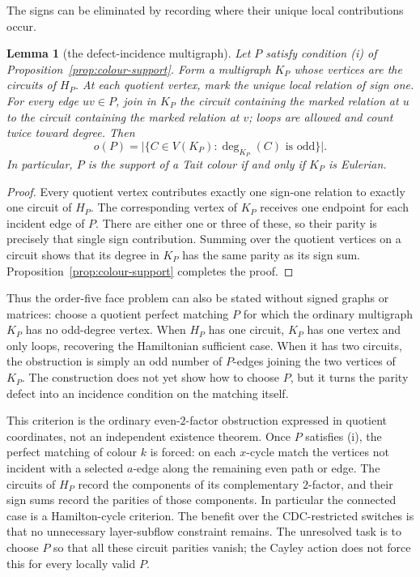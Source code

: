 \documentclass[11pt,a4paper]{article}
\newtheorem{lemma}[theorem]{Lemma}
\theoremstyle{definition}
\theoremstyle{remark}
\begin{document}
The signs can be eliminated by recording where their unique local contributions occur.
\begin{lemma}[the defect-incidence multigraph]\label{lem:defect-incidence}
Let $P$ satisfy condition \textup{(i)} of Proposition~\ref{prop:colour-support}.  Form a multigraph $K_P$ whose vertices are the circuits of $H_P$.  At each quotient vertex, mark the unique local relation of sign one.  For every edge $uv\in P$, join in $K_P$ the circuit containing the marked relation at $u$ to the circuit containing the marked relation at $v$; loops are allowed and count twice toward degree.  Then
\[
 o(P)=\bigl|\{C\in V(K_P):\deg_{K_P}(C)\text{ is odd}\}\bigr|.
\]
In particular, $P$ is the support of a Tait colour if and only if $K_P$ is Eulerian.
\end{lemma}
\begin{proof}
Every quotient vertex contributes exactly one sign-one relation to exactly one circuit of $H_P$.  The corresponding vertex of $K_P$ receives one endpoint for each incident edge of $P$.  There are either one or three of these, so their parity is precisely that single sign contribution.  Summing over the quotient vertices on a circuit shows that its degree in $K_P$ has the same parity as its sign sum.  Proposition~\ref{prop:colour-support} completes the proof.
\end{proof}

Thus the order-five face problem can also be stated without signed graphs or matrices: choose a quotient perfect matching $P$ for which the ordinary multigraph $K_P$ has no odd-degree vertex.  When $H_P$ has one circuit, $K_P$ has one vertex and only loops, recovering the Hamiltonian sufficient case.  When it has two circuits, the obstruction is simply an odd number of $P$-edges joining the two vertices of $K_P$.  The construction does not yet show how to choose $P$, but it turns the parity defect into an incidence condition on the matching itself.

This criterion is the ordinary even-$2$-factor obstruction expressed in quotient coordinates, not an independent existence theorem.  Once $P$ satisfies \textup{(i)}, the perfect matching of colour $k$ is forced: on each $x$-cycle match the vertices not incident with a selected $a$-edge along the remaining even path or edge.  The circuits of $H_P$ record the components of its complementary $2$-factor, and their sign sums record the parities of those components.  In particular the connected case is a Hamilton-cycle criterion.  The benefit over the CDC-restricted switches is that no unnecessary layer-subflow constraint remains.  The unresolved task is to choose $P$ so that all these circuit parities vanish; the Cayley action does not force this for every locally valid $P$.
\end{document}
